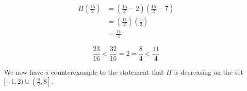 \documentclass{ximera}
\begin{document}
\begin{exercise}
\begin{question}
\begin{warning}
\begin{align*}
H\left( \frac{15}{2} \right) & = \left( \frac{15}{2} - 2 \right) \left( \frac{15}{2} - 7 \right) \\
& = \left( \frac{11}{2} \right) \left( \frac{1}{2} \right) \\
& = \frac{11}{4}  
\end{align*}


\[
\frac{23}{16}  < \frac{32}{16} = 2 = \frac{8}{4} < \frac{11}{4} 
\]

\end{warning}


We now have a counterexample to the statement that $H$ is decreasing on the set $[-1, 2) \cup \left( \frac{9}{2}, 8 \right]$.





\end{question}








\end{exercise}
\end{document}
